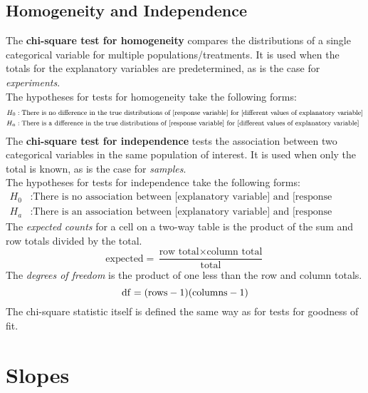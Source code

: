 \documentclass[../AP_Statistics.tex]{subfiles}
\begin{document}
		\section{Homogeneity and Independence}
			The \textbf{chi-square test for homogeneity} compares the distributions of a single categorical variable for multiple populations/treatments. It is used when the totals for the explanatory variables are predetermined, as is the case for \emph{experiments}. \\
			The hypotheses for tests for homogeneity take the following forms:
			\[\footnotesize\begin{aligned}
				H_0&: \text{There is no difference in the true distributions of [response variable] for [different values of explanatory variable]} \\
				H_a&: \text{There is a difference in the true distributions of [response variable] for [different values of explanatory variable]}
			\end{aligned}\]
			The \textbf{chi-square test for independence} tests the association between two categorical variables in the same population of interest. It is used when only the total is known, as is the case for \emph{samples}. \\
			The hypotheses for tests for independence take the following forms:
			\[\begin{aligned}
				H_0&: \text{There is no association between [explanatory variable] and [response variable]} \\
				H_a&: \text{There is an association between [explanatory variable] and [response variable]}
			\end{aligned}\]
			The \emph{expected counts} for a cell on a two-way table is the product of the sum and row totals divided by the total.
			\[\mathrm{expected = \frac{\text{row total} \times \text{column total}}{total}}\]
			The \emph{degrees of freedom} is the product of one less than the row and column totals.
			\[\mathrm{\operatorname{\mathrm{df}} = (rows - 1)(columns - 1)}\]
			The chi-square statistic itself is defined the same way as for tests for goodness of fit.
	\chapter{Slopes}
\end{document}

